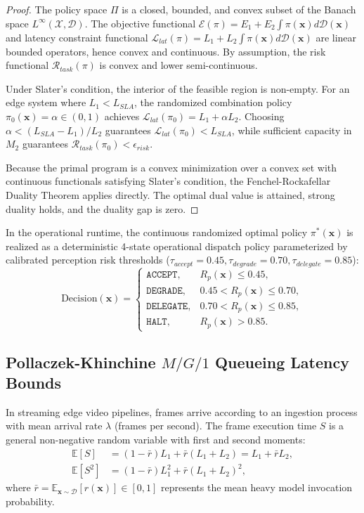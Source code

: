 \documentclass[conference]{IEEEtran}
\begin{document}
\begin{proof}
The policy space $\Pi$ is a closed, bounded, and convex subset of the Banach space $L^\infty(\mathcal{X}, \mathcal{D})$. The objective functional $\mathcal{E}(\pi) = E_1 + E_2 \int \pi(\mathbf{x}) d\mathcal{D}(\mathbf{x})$ and latency constraint functional $\mathcal{L}_{lat}(\pi) = L_1 + L_2 \int \pi(\mathbf{x}) d\mathcal{D}(\mathbf{x})$ are linear bounded operators, hence convex and continuous. By assumption, the risk functional $\mathcal{R}_{task}(\pi)$ is convex and lower semi-continuous.

Under Slater's condition, the interior of the feasible region is non-empty. For an edge system where $L_1 < L_{SLA}$, the randomized combination policy $\pi_0(\mathbf{x}) = \alpha \in (0, 1)$ achieves $\mathcal{L}_{lat}(\pi_0) = L_1 + \alpha L_2$. Choosing $\alpha < (L_{SLA} - L_1) / L_2$ guarantees $\mathcal{L}_{lat}(\pi_0) < L_{SLA}$, while sufficient capacity in $M_2$ guarantees $\mathcal{R}_{task}(\pi_0) < \epsilon_{risk}$. 

Because the primal program is a convex minimization over a convex set with continuous functionals satisfying Slater's condition, the Fenchel-Rockafellar Duality Theorem \cite{rockafellar1970convex} applies directly. The optimal dual value is attained, strong duality holds, and the duality gap is zero.
\end{proof}

In the operational runtime, the continuous randomized optimal policy $\pi^*(\mathbf{x})$ is realized as a deterministic 4-state operational dispatch policy parameterized by calibrated perception risk thresholds ($\tau_{accept}=0.45, \tau_{degrade}=0.70, \tau_{delegate}=0.85$):
\begin{equation}
\mathrm{Decision}(\mathbf{x}) = \begin{cases}
\mathtt{ACCEPT}, & R_p(\mathbf{x}) \le 0.45, \\
\mathtt{DEGRADE}, & 0.45 < R_p(\mathbf{x}) \le 0.70, \\
\mathtt{DELEGATE}, & 0.70 < R_p(\mathbf{x}) \le 0.85, \\
\mathtt{HALT}, & R_p(\mathbf{x}) > 0.85.
\end{cases}
\end{equation}

\subsection{Pollaczek-Khinchine $M/G/1$ Queueing Latency Bounds}
In streaming edge video pipelines, frames arrive according to an ingestion process with mean arrival rate $\lambda$ (frames per second). The frame execution time $S$ is a general non-negative random variable with first and second moments:
\begin{align}
\mathbb{E}[S] &= (1 - \bar{r}) L_1 + \bar{r} (L_1 + L_2) = L_1 + \bar{r} L_2, \\
\mathbb{E}[S^2] &= (1 - \bar{r}) L_1^2 + \bar{r} (L_1 + L_2)^2,
\end{align}
where $\bar{r} = \mathbb{E}_{\mathbf{x} \sim \mathcal{D}} [r(\mathbf{x})] \in [0, 1]$ represents the mean heavy model invocation probability.
\end{document}
